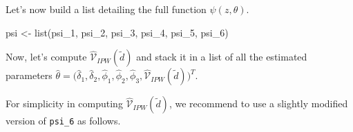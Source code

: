 \documentclass[
]{article}
\newenvironment{Shaded}{\begin{snugshade}}{\end{snugshade}}
\newcommand{\FunctionTok}[1]{\textcolor[rgb]{0.00,0.00,0.00}{#1}}
\newcommand{\NormalTok}[1]{#1}
\newcommand{\OtherTok}[1]{\textcolor[rgb]{0.56,0.35,0.01}{#1}}
\begin{document}
Let's now build a list detailing the full function \(\psi(z,\theta)\).

\begin{Shaded}
\begin{Highlighting}[]
\NormalTok{psi }\OtherTok{\textless{}{-}} \FunctionTok{list}\NormalTok{(psi\_1, psi\_2, psi\_3, psi\_4, psi\_5, psi\_6)}
\end{Highlighting}
\end{Shaded}

Now, let's compute \(\hat{\mathcal{V}}_{IPW}(\tilde{d})\) and stack it
in a list of all the estimated parameters
\(\hat{\theta}=\Big(\hat{\delta}_1,\hat{\delta}_2,\hat{\phi}_1,\hat{\phi}_2,\hat{\phi}_3, \hat{\mathcal{V}}_{IPW}(\tilde{d})\Big)^T\).

For simplicity in computing \(\hat{\mathcal{V}}_{IPW}(\tilde{d})\), we
recommend to use a slightly modified version of \texttt{psi\_6} as
follows.
\end{document}
